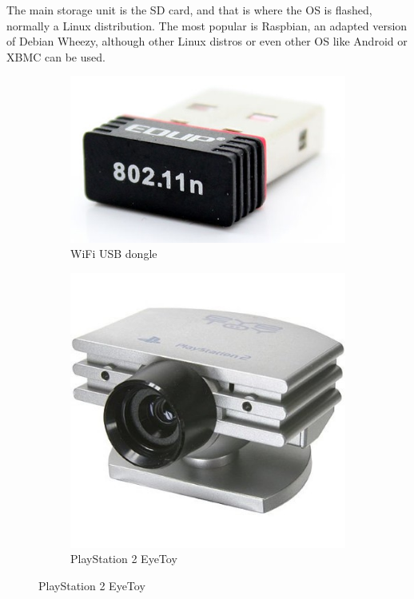 	The main storage unit is the SD card, and that is where the OS is flashed, normally a Linux distribution. The most popular is Raspbian, an adapted version of Debian Wheezy, although other Linux distros or even other OS like Android or XBMC can be used.

		\begin{figure}[H]
		    \centering
		    \begin{subfigure}[b]{0.3\textwidth}
		        \centering
		        \includegraphics[scale=0.25]{images/ProjectComponents/wifi.jpg}
				\caption{WiFi USB dongle}
		        \label{}
		    \end{subfigure}
		    \hfill
		    \begin{subfigure}[b]{0.3\textwidth}
		        \centering
		        \includegraphics[scale=0.25]{images/ProjectComponents/camera.jpg}
				\caption{PlayStation 2 EyeToy }
		        \label{}

\end{subfigure}
\end{figure}
